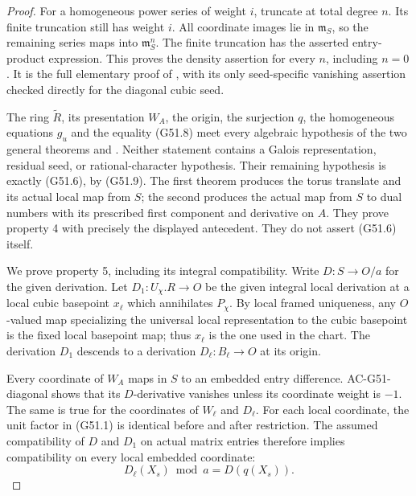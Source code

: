 \begin{proof}
For a homogeneous power series of weight $i$, truncate
at total degree $n$.  Its finite truncation still has
weight $i$.  All coordinate images lie in $\mathfrak m_S$,
so the remaining series maps into $\mathfrak m_S^n$.
The finite truncation has the asserted entry-product
expression.  This proves the density assertion for every
$n$, including $n=0$.
It is the full elementary proof of
,
with its only seed-specific vanishing assertion checked
directly for the diagonal cubic seed.

The ring $\widetilde R$, its presentation $W_A$, the
origin, the surjection $q$, the homogeneous equations
$g_u$ and the equality (G51.8) meet every algebraic
hypothesis of the two general theorems
and
.
Neither statement contains a Galois representation,
residual seed, or rational-character hypothesis.
Their remaining hypothesis is exactly (G51.6), by
(G51.9).  The first theorem produces the torus translate
and its actual local map from $S$; the second produces
the actual map from $S$ to dual numbers with its prescribed
first component and derivative on $A$.
They prove property 4 with precisely the displayed
antecedent.  They do not assert (G51.6) itself.

We prove property 5, including its integral compatibility.
Write $D:S\to O/a$ for the given derivation.
Let $D_1:U_\chi.R\to O$ be the given integral local
derivation at a local cubic basepoint $x_\ell$ which
annihilates $P_\chi$.
By local framed uniqueness, any $O$-valued map
specializing the universal local representation to
the cubic basepoint is the fixed local basepoint map;
thus $x_\ell$ is the one used in the chart.
The derivation $D_1$ descends to a derivation
$D_\ell:B_\ell\to O$ at its origin.

Every coordinate of $W_A$ maps in $S$ to an embedded
entry difference.  AC-G51-diagonal shows that its
$D$-derivative vanishes unless its coordinate weight is
$-1$.  The same is true for the coordinates of
$W_\ell$ and $D_\ell$.
For each local coordinate, the unit factor in (G51.1)
is identical before and after restriction.
The assumed compatibility of $D$ and $D_1$ on actual
matrix entries therefore implies compatibility on
every local embedded coordinate:
\[
 D_\ell(X_s)\bmod a=D(q(X_s)).                               \tag{G51.11}
\]


\end{proof}
